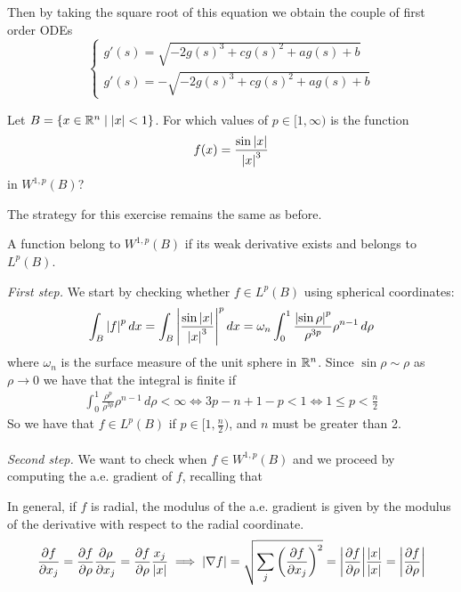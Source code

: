 Then by taking the square root of this equation we obtain the couple of first
order ODEs
\[
    \begin{cases}
        g'(s) = \sqrt{-2 g(s)^3 + c g(s)^2 + a g(s) + b} \\
        g'(s) = -\sqrt{-2 g(s)^3 + c g(s)^2 + a g(s) + b}
    \end{cases}
\]

\newpage
\begin{exercise}
    Let \(B = \left\{ x \in \mathbb{R}^n \mid \abs{x} < 1 \right\}\). For which values of \(p \in [1, \infty) \) is the function
    \[
        f(x) = \frac{\sin\abs{x}}{\abs{x}^3}
    \]
    in \(W^{1, p}(B)\)?
\end{exercise}
The strategy for this exercise remains the same as before.
\begin{remark}
    A function belong to \(W^{1, p}(B)\) if its weak derivative exists and belongs to \(L^p(B)\).
\end{remark}
\textit{First step.} We start by checking whether $f \in L^p(B)$ using spherical coordinates:
\[
    \int_B \abs{f}^p \, dx = \int_B \abs{\frac{\sin\abs{x}}{\abs{x}^3}}^p \, dx = \omega_n \int_0^1 \frac{\abs{\sin\rho}^p}{\rho^{3p}} \rho^{n-1} \, d\rho
\]
where \(\omega_n\) is the surface measure of the unit sphere in \(\mathbb{R}^n\).
Since $\sin \rho \sim \rho$ as $\rho \rightarrow 0$ we have that the integral
is finite if
\[
    \begin{split}
        \int_0^1 \frac{\rho^p}{\rho^{3p}} \rho^{n-1} \, d\rho < \infty \iff 3p - n + 1 - p < 1 \iff 1 \leq p < \frac{n}{2}
    \end{split}
\]
So we have that $f \in L^p(B)$ if $p \in [1, \frac{n}{2})$, and $n$ must be
greater than 2. \\ \vspace{0.1cm}\\ \textit{Second step.} We want to check when
\(f \in W^{1, p}(B)\) and we proceed by computing the a.e. gradient of \(f\),
recalling that
\begin{remark}
    In general, if \(f\) is radial, the modulus of the a.e. gradient is given by the modulus of the derivative with respect to the radial coordinate.
    \begin{equation*}
        \frac{\partial f}{\partial x_j} = \frac{\partial f}{\partial \rho} \frac{\partial \rho}{\partial x_j} = \frac{\partial f}{\partial \rho} \frac{x_j}{\abs{x}}
        \implies \abs{\nabla f} = \sqrt{\sum_j \left(\frac{\partial f}{\partial x_j}\right)^2} = \abs{\frac{\partial f}{\partial \rho}} \frac{\abs{x}}{\abs{x}} = \abs{\frac{\partial f}{\partial \rho}}
    \end{equation*}
\end{remark}
